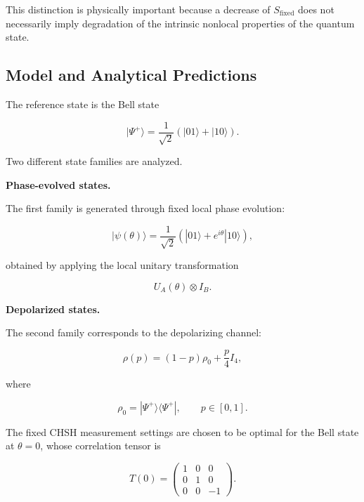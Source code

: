 This distinction is physically important because a decrease of \(S_{\mathrm{fixed}}\) does not necessarily imply degradation of the intrinsic nonlocal properties of the quantum state.


\subsection*{Model and Analytical Predictions}

The reference state is the Bell state

\[
|\Psi^+\rangle
=
\frac{1}{\sqrt{2}}
\left(
|01\rangle + |10\rangle
\right).
\]

Two different state families are analyzed.

\medskip

\textbf{Phase-evolved states.}

The first family is generated through fixed local phase evolution:

\begin{equation}
|\psi(\theta)\rangle
=
\frac{1}{\sqrt{2}}
\left(
|01\rangle + e^{i\theta}|10\rangle
\right),
\label{eq:chsh_phase_state}
\end{equation}

obtained by applying the local unitary transformation

\[
U_A(\theta)
\otimes
I_B.
\]

\medskip

\textbf{Depolarized states.}

The second family corresponds to the depolarizing channel:

\begin{equation}
\rho(p)
=
(1-p)\rho_0
+
\frac{p}{4}I_4,
\label{eq:chsh_depolarized_state}
\end{equation}

where

\[
\rho_0
=
|\Psi^+\rangle
\langle\Psi^+|,
\qquad
p \in [0,1].
\]

\medskip

The fixed CHSH measurement settings are chosen to be optimal for the Bell state at \( \theta = 0 \), whose correlation tensor is

\[
T(0)
=
\begin{pmatrix}
1 & 0 & 0 \\
0 & 1 & 0 \\
0 & 0 & -1
\end{pmatrix}.
\]

